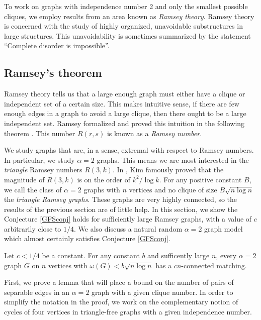 To work on graphs with independence number 2 and only the smallest possible cliques, we employ results from an area known as {\it Ramsey theory}.  Ramsey theory is concerned with the study of highly organized, unavoidable substructures in large structures.  This unavoidability is sometimes summarized by the statement ``Complete disorder is impossible''.

\subsection{Ramsey's theorem}

Ramsey theory tells us that a large enough graph must either have a clique or independent set of a certain size.  This makes intuitive sense, if there are few enough edges in a graph to avoid a large clique, then there ought to be a large independent set.  Ramsey formalized and proved this intuition in the following theorem \cite{ramsey}.
This number $R(r,s)$ is known as a {\it Ramsey number}.  

We study graphs that are, in a sense, extremal with respect to Ramsey numbers.  In particular, we study $\alpha = 2$ graphs.  This means we are most interested in the {\it triangle} Ramsey numbers $R(3,k)$.  In \cite{Kim}, Kim famously proved that the magnitude of $R(3,k)$ is on the order of $k^2/\log k$.  For any positive constant $B$, we call the class of $\alpha = 2$ graphs with $n$ vertices and no clique of size $B\sqrt{n\log n}$ the {\it triangle Ramsey graphs}.
%
These graphs are very highly connected, so the results of the previous section are of little help.
%
In this section, we show the Conjecture \ref{GFSconj} holds for sufficiently large Ramsey graphs, with a value of $c$ arbitrarily close to $1/4$.
%
We also discuss a natural random $\alpha = 2$ graph model which almost certainly satisfies Conjecture \ref{GFSconj}. 

\begin{theorem}
Let $c < 1/4$ be a constant.  For any constant $b$ and sufficently large $n$, every $\alpha = 2$ graph $G$ on $n$ vertices with $\omega(G) < b\sqrt{n\log n}$ has a $cn$-connected matching.
\label{sm_cli}
\end{theorem}

First, we prove a lemma that will place a bound on the number of pairs of separable edges in an $\alpha = 2$ graph with a given clique number.  In order to simplify the notation in the proof, we work on the complementary notion of  cycles of four vertices in triangle-free graphs with a given independence number.  

